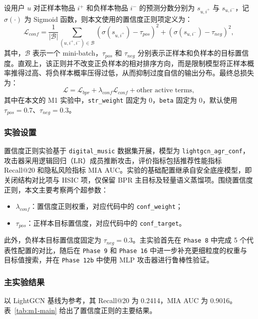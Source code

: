 设用户 $u$ 对正样本物品 $i^{+}$ 和负样本物品 $i^{-}$ 的预测分数分别为 $s_{u,i^{+}}$ 与 $s_{u,i^{-}}$，记 $\sigma(\cdot)$ 为 Sigmoid 函数，则本文使用的置信度正则项定义为：
\begin{equation}
\mathcal{L}_{conf}
=
\frac{1}{|\mathcal{B}|}\sum_{(u,i^{+},i^{-}) \in \mathcal{B}}
\left(\sigma(s_{u,i^{+}})-\tau_{pos}\right)^2
+
\left(\sigma(s_{u,i^{-}})-\tau_{neg}\right)^2,
\label{eq:conf_loss}
\end{equation}
其中，$\mathcal{B}$ 表示一个 mini-batch，$\tau_{pos}$ 和 $\tau_{neg}$ 分别表示正样本和负样本的目标置信度。直观上，该正则并不改变正负样本的相对排序方向，而是限制模型将正样本概率推得过高、将负样本概率压得过低，从而抑制过度自信的输出分布。最终总损失为：
\begin{equation}
\mathcal{L}
=
\mathcal{L}_{bpr}
+ \lambda_{conf}\mathcal{L}_{conf}
+ \text{other active terms},
\end{equation}
其中在本文的 M1 实验中，\texttt{str\_weight} 固定为 0，\texttt{beta} 固定为 0，默认使用 $\tau_{pos}=0.7$、$\tau_{neg}=0.3$。

\subsubsection{实验设置}
置信度正则实验基于 \texttt{digital\_music} 数据集开展，模型为 \texttt{lightgcn\_agr\_conf}，攻击器采用逻辑回归（LR）成员推断攻击，评价指标包括推荐性能指标 Recall@20 和隐私风险指标 MIA AUC。实验的基础配置继承自安全底座模型，即关闭结构对比项与 HSIC 项，仅保留 BPR 主目标及轻量语义蒸馏项。围绕置信度正则，本文主要考察两个超参数：
\begin{itemize}
\item $\lambda_{conf}$：置信度正则权重，对应代码中的 \texttt{conf\_weight}；
\item $\tau_{pos}$：正样本目标置信度，对应代码中的 \texttt{conf\_target}。
\end{itemize}
此外，负样本目标置信度固定为 $\tau_{neg}=0.3$。主实验首先在 \texttt{Phase 8} 中完成 5 个代表性配置的对比，随后在 \texttt{Phase 9} 和 \texttt{Phase 16} 中进一步补充更细粒度的权重与目标值搜索，并在 \texttt{Phase 12b} 中使用 MLP 攻击器进行鲁棒性验证。

\subsubsection{主实验结果}
以 LightGCN 基线为参考，其 Recall@20 为 0.2414，MIA AUC 为 0.9016。表~\ref{tab:m1-main} 给出了置信度正则的主要结果。

